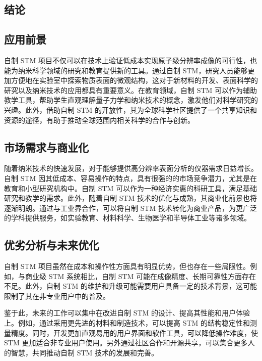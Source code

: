 \documentclass{article}
\begin{document}
\begin{spacing}{1.625}
	
	
	\clearpage
	\setcounter{section}{5}	 	%
	\setcounter{subsection}{0}	%
	
	
\section*{结论}
	\subsection{应用前景}
		自制 STM 项目不仅可以在技术上验证低成本实现原子级分辨率成像的可行性，也能为纳米科学领域的研究和教育提供新的工具。通过自制 STM，研究人员能够更加方便地在实验室中探索物质表面的微观结构，这对于新材料的开发、表面科学的研究以及纳米技术的应用都具有重要意义。在教育领域，自制 STM 可以作为辅助教学工具，帮助学生直观理解量子力学和纳米技术的概念，激发他们对科学研究的兴趣。此外，借助自制 STM 的开放性，其为全球科学社区提供了一个共享知识和资源的途径，有助于推动全球范围内相关科学的合作与创新。
	
	
	\subsection{市场需求与商业化}
		随着纳米技术的快速发展，对于能够提供高分辨率表面分析的仪器需求日益增长。自制 STM 因其低成本、容易操作的特点，具有很强的的市场竞争潜力，尤其是在教育和小型研究机构中。自制 STM 可以作为一种经济实惠的科研工具，满足基础研究和教学的需求。此外，随着自制 STM 技术的优化与成熟，其商业化前景也将逐渐明朗。通过与工业界合作，可以将自制 STM 技术转化为商业产品，为更广泛的学科提供服务，如实验教育、材料科学、生物医学和半导体工业等诸多领域。
	
	
	\subsection{优劣分析与未来优化}
		自制 STM 项目虽然在成本和操作性方面具有明显优势，但也存在一些局限性。例如，与商业级 STM 系统相比，自制 STM 可能在成像精度、长期可靠性方面存在不足。此外，自制 STM 的维护和升级可能需要用户具备一定的技术背景，这可能限制了其在非专业用户中的普及。
		
		鉴于此，未来的工作可以集中在改进自制 STM 的设计、提高其性能和用户体验上。例如，通过采用更先进的材料和制造技术，可以提高 STM 的结构稳定性和测量精度。同时，开发更加直观易用的用户界面和软件工具，可以降低操作难度，使 STM 更加适合非专业用户使用。另外通过社区合作和开源共享，可以集合更多人的智慧，共同推动自制 STM 技术的发展和完善。
	

\end{spacing}
\end{document}
